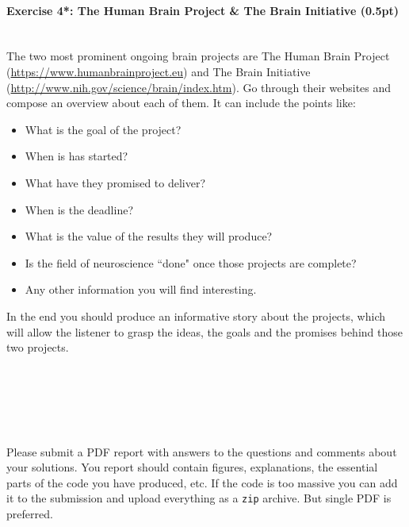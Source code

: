 \documentclass[a4paper,11pt]{article}
\newenvironment{exercise}[3]{\paragraph{Exercise #1: #2 (#3pt)}\ \\}{
\medskip}
\begin{document}
%
%
\begin{exercise}{4*}{The Human Brain Project \& The Brain Initiative}{0.5}
The two most prominent ongoing brain projects are The Human Brain Project (\url{https://www.humanbrainproject.eu}) and The Brain Initiative (\url{http://www.nih.gov/science/brain/index.htm}). Go through their websites and compose an overview about each of them. It can include the points like:
\begin{itemize}
\itemsep 0em
	\item What is the goal of the project?
	\item When is has started?
	\item What have they promised to deliver?
	\item When is the deadline?
	\item What is the value of the results they will produce?
	\item Is the field of neuroscience ``done" once those projects are complete?
	\item Any other information you will find interesting.
\end{itemize}
In the end you should produce an informative story about the projects, which will allow the listener to grasp the ideas, the goals and the promises behind those two projects.
\end{exercise}


\ \\
\ \\
\ \\
\ \\
\ \\
Please submit a PDF report with answers to the questions and comments about your solutions. You report should contain figures, explanations, the essential parts of the code you have produced, etc. If the code is too massive you can add it to the submission and upload everything as a \texttt{zip} archive. But single PDF is preferred.
\end{document}
